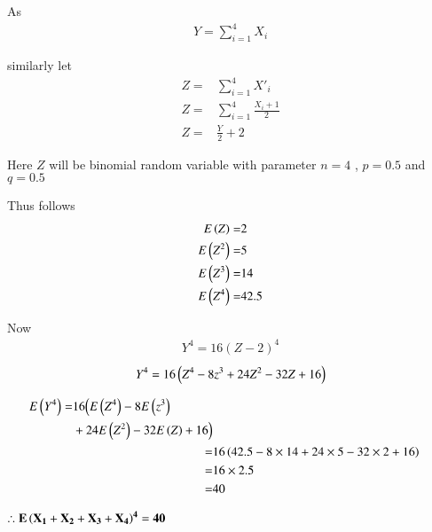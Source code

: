 \documentclass[journal,12pt,twocolumn]{IEEEtran}
\begin{document}
As 
\begin{align}
Y=\sum_{i=1}^{4}X_i
\end{align} 

similarly let 
\begin{align}
Z=&\sum_{i=1}^{4}X'_i
\\ Z=&\sum_{i=1}^{4} \frac{X_i+1}{2}
\\ Z=&\frac{Y}{2} + 2
\end{align}

Here $Z$ will be  binomial random variable with parameter $n=4$ , $p=0.5$ and $q=0.5$ 

Thus follows
\begin{align}
    E\left(Z\right)=& 2
    \\E\left(Z^2\right)=& 5
    \\E\left(Z^3\right)=& 14
    \\E\left(Z^4\right)=& 42.5
\end{align}

Now
\begin{align}
    {Y^4}=16{(Z-2)^4}
\end{align}
\begin{align}
    {Y^4}=16\left(Z^4-8z^3+24Z^2-32Z+16\right)
\end{align}

\begin{align}
\begin{split}
    E\left(Y^4\right)=&16\Bigl(E\left(Z^4\right)-8E\left(z^3\right)
    \\&+24E\left(Z^2\right)-32E\left(Z\right)+16\Bigr)
\end{split}    
    \\=&16\left(42.5-8\times 14+24\times 5-32\times 2+16\right)
    \\=&16\times 2.5
    \\=&40
\end{align}

{\centering
$\mathbf{\therefore E\left(X_1+X_2 +X_3 +X_4\right)^4=40}$

}
\end{document}
